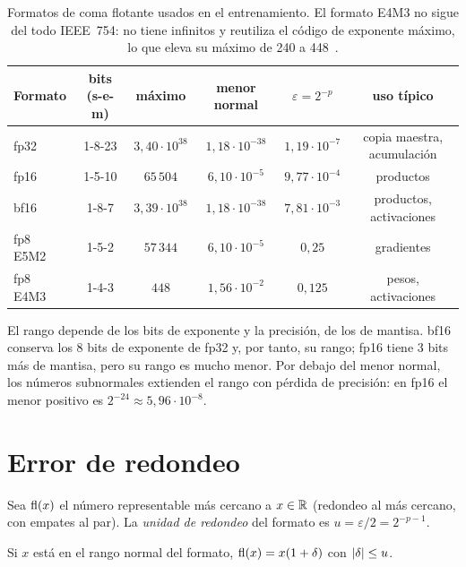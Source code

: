 \begin{table}[h]
\centering\small
\begin{tabular}{@{}lccccc@{}}
\toprule
Formato & bits (s-e-m) & máximo & menor normal & $\varepsilon=2^{-p}$ & uso típico \\
\midrule
fp32 & 1-8-23 & $3{,}40\cdot 10^{38}$ & $1{,}18\cdot 10^{-38}$ & $1{,}19\cdot 10^{-7}$ & copia maestra, acumulación \\
fp16 & 1-5-10 & $65\,504$ & $6{,}10\cdot 10^{-5}$ & $9{,}77\cdot 10^{-4}$ & productos \\
bf16 & 1-8-7 & $3{,}39\cdot 10^{38}$ & $1{,}18\cdot 10^{-38}$ & $7{,}81\cdot 10^{-3}$ & productos, activaciones \\
fp8 E5M2 & 1-5-2 & $57\,344$ & $6{,}10\cdot 10^{-5}$ & $0{,}25$ & gradientes \\
fp8 E4M3 & 1-4-3 & $448$ & $1{,}56\cdot 10^{-2}$ & $0{,}125$ & pesos, activaciones \\
\bottomrule
\end{tabular}
\caption{Formatos de coma flotante usados en el entrenamiento. El formato E4M3 no sigue del todo IEEE~754: no tiene infinitos y reutiliza el código de exponente máximo, lo que eleva su máximo de 240 a 448~\cite{fp8}.}
\label{tab:formatos}
\end{table}

El rango depende de los bits de exponente y la precisión, de los de mantisa. bf16 conserva los 8 bits de exponente de fp32 y, por tanto, su rango; fp16 tiene 3 bits más de mantisa, pero su rango es mucho menor. Por debajo del menor normal, los números subnormales extienden el rango con pérdida de precisión: en fp16 el menor positivo es $2^{-24}\approx 5{,}96\cdot 10^{-8}$.

\section{Error de redondeo}

\begin{definicion}
Sea $\operatorname{fl}(x)$ el número representable más cercano a $x\in\mathbb{R}$ (redondeo al más cercano, con empates al par). La \emph{unidad de redondeo} del formato es $u=\varepsilon/2=2^{-p-1}$.
\end{definicion}

\begin{teorema}\label{teo:redondeo}
Si $x$ está en el rango normal del formato, $\operatorname{fl}(x)=x(1+\delta)$ con $\lvert\delta\rvert\le u$.
\end{teorema}

